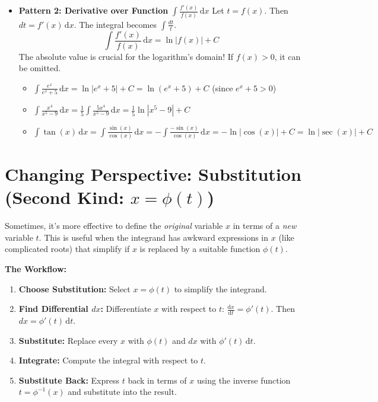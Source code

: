 \documentclass[11pt]{article}
\newcommand{\dx}{\,\mathrm{d}x} %
\newcommand{\dt}{\,\mathrm{d}t} %
\newcommand{\ddt}[1]{\frac{\mathrm{d}#1}{\mathrm{d}t}} %
\begin{document}
\begin{itemize}
    \item \textbf{Pattern 2: Derivative over Function} $\int \frac{f'(x)}{f(x)} \dx$
        Let $t = f(x)$. Then $dt = f'(x) \dx$.
        The integral becomes $\int \frac{dt}{t}$.
        \[ \boxed{\int \frac{f'(x)}{f(x)} \dx = \ln|f(x)| + C} \]
        The absolute value is crucial for the logarithm's domain! If $f(x)>0$, it can be omitted.
        \begin{itemize}
            \item $\int \frac{e^x}{e^x+5} \dx = \ln|e^x+5| + C = \ln(e^x+5) + C$ (since $e^x+5 > 0$)
            \item $\int \frac{x^4}{x^5-9} \dx = \frac{1}{5} \int \frac{5x^4}{x^5-9} \dx = \frac{1}{5} \ln|x^5-9| + C$
            \item $\int \tan(x) \dx = \int \frac{\sin(x)}{\cos(x)} \dx = -\int \frac{-\sin(x)}{\cos(x)} \dx = -\ln|\cos(x)| + C = \ln|\sec(x)| + C$
        \end{itemize}
\end{itemize}

\section{Changing Perspective: Substitution (Second Kind: $x = \phi(t)$)}

Sometimes, it's more effective to define the \textit{original} variable $x$ in terms of a \textit{new} variable $t$. This is useful when the integrand has awkward expressions in $x$ (like complicated roots) that simplify if $x$ is replaced by a suitable function $\phi(t)$.

\textbf{The Workflow:}
\begin{enumerate}
    \item \textbf{Choose Substitution:} Select $x = \phi(t)$ to simplify the integrand.
    \item \textbf{Find Differential $dx$:} Differentiate $x$ with respect to $t$: $\ddt{x} = \phi'(t)$. Then $dx = \phi'(t) \dt$.
    \item \textbf{Substitute:} Replace every $x$ with $\phi(t)$ and $dx$ with $\phi'(t) \dt$.
    \item \textbf{Integrate:} Compute the integral with respect to $t$.
    \item \textbf{Substitute Back:} Express $t$ back in terms of $x$ using the inverse function $t = \phi^{-1}(x)$ and substitute into the result.
\end{enumerate}
\end{document}
